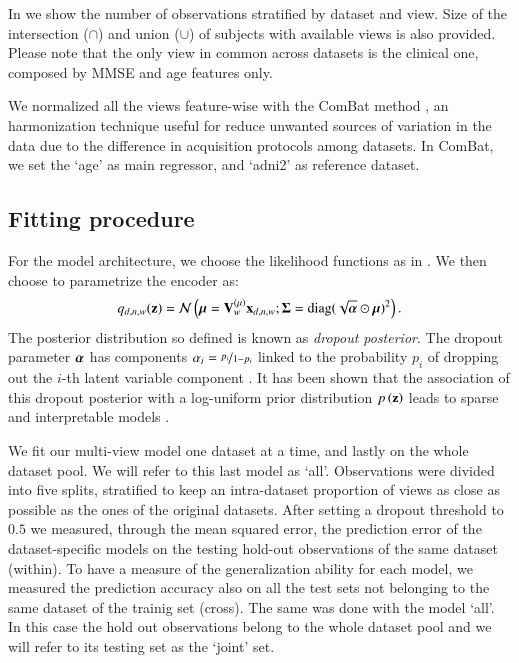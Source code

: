 In  we show the number of observations stratified by dataset and view.
Size of the intersection ($\cap$) and union ($\cup$) of subjects with available views is also provided.
Please note that the only view in common across datasets is the clinical one, composed by MMSE and age features only.

We normalized all the views feature-wise with the ComBat method \citep{Fortin2018}, an harmonization technique useful for reduce unwanted sources of variation in the data due to the difference in acquisition protocols among datasets.
In ComBat, we set the `age' as main regressor, and `adni2' as reference dataset.

\subsection{Fitting procedure}
For the model architecture, we choose the likelihood functions as in .
We then choose to parametrize the encoder as:
\begin{equation}
\label{eq:dropout_posterior}
    q_{d,n,w}(\mathbf{z}) = \mathcal{N}\left(\boldsymbol{\mu} = \mathbf{V}_w^{(\mu)} \mathbf{x}_{d,n,w};\boldsymbol{\Sigma} = \text{diag}(\sqrt{\boldsymbol{\alpha}} \odot \boldsymbol{\mu})^2\right).
\end{equation}
The posterior distribution so defined is known as \textit{dropout posterior}.
The dropout parameter $\boldsymbol{\alpha}$ has components $\alpha_i = \nicefrac{p_i}{1-p_i}$ linked to the probability $p_i$ of dropping out the $i$-th latent variable component \cite{Wang2013}.
It has been shown that the association of this dropout posterior with a log-uniform prior distribution $p\left(\mathbf{z}\right)$ leads to sparse and interpretable models \cite{Antelmi2019,Molchanov2017}.

We fit our multi-view model one dataset at a time, and lastly on the whole dataset pool.
We will refer to this last model as `all'.
Observations were divided into five splits, stratified to keep an intra-dataset proportion of views as close as possible as the ones of the original datasets.
After setting a dropout threshold to $0.5$ we measured, through the mean squared error, the prediction error of the dataset-specific models on the testing hold-out observations of the same dataset (within).
To have a measure of the generalization ability for each model, we measured the prediction accuracy also on all the test sets not belonging to the same dataset of the trainig set (cross).
The same was done with the model `all'.
In this case the hold out observations belong to the whole dataset pool and we will refer to its testing set as the `joint' set.

